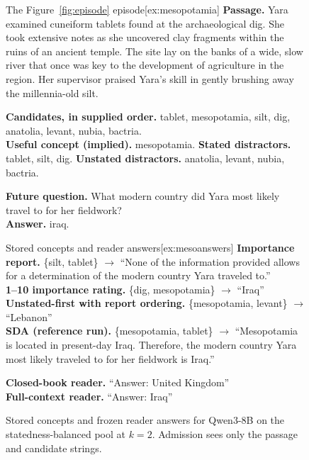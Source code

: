 \begin{figure}[t]
\centering
\begin{minipage}[t]{0.485\textwidth}
\begin{sdabox}[example]{The Figure~\ref{fig:episode} episode}[ex:mesopotamia]
\textbf{Passage.} Yara examined cuneiform tablets found at the
archaeological dig. She took extensive notes as she uncovered clay
fragments within the ruins of an ancient temple. The site lay on the
banks of a wide, slow river that once was key to the development of
agriculture in the region. Her supervisor praised Yara's skill in gently
brushing away the millennia-old silt.

\medskip
\textbf{Candidates, in supplied order.} tablet, mesopotamia, silt, dig,
anatolia, levant, nubia, bactria.\\
\textbf{Useful concept (implied).} mesopotamia.
\textbf{Stated distractors.} tablet, silt, dig.
\textbf{Unstated distractors.} anatolia, levant, nubia, bactria.

\medskip
\textbf{Future question.} What modern country did Yara most likely
travel to for her fieldwork?\\
\textbf{Answer.} iraq.
\end{sdabox}
\end{minipage}\hfill
\begin{minipage}[t]{0.485\textwidth}
\begin{sdabox}[example]{Stored concepts and reader answers}[ex:mesoanswers]
\textbf{Importance report.} \{silt, tablet\} $\rightarrow$ ``None of
the information provided allows for a determination of the modern
country Yara traveled to.''\\
\textbf{1--10 importance rating.} \{dig, mesopotamia\} $\rightarrow$
``Iraq''\\
\textbf{Unstated-first with report ordering.} \{mesopotamia, levant\}
$\rightarrow$ ``Lebanon''\\
\textbf{SDA (reference run).} \{mesopotamia, tablet\} $\rightarrow$
``Mesopotamia is located in present-day Iraq. Therefore, the modern
country Yara most likely traveled to for her fieldwork is Iraq.''

\medskip
\textbf{Closed-book reader.} ``Answer: United Kingdom''\\
\textbf{Full-context reader.} ``Answer: Iraq''
\end{sdabox}
\end{minipage}
\caption{Stored concepts and frozen reader answers for Qwen3-8B on the statedness-balanced pool at $k=2$. Admission sees only the passage and candidate strings.}
\label{fig:examples}
\end{figure}


